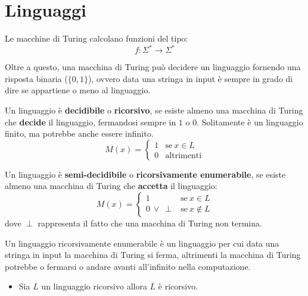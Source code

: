 \section{Linguaggi}
Le macchine di Turing calcolano funzioni del tipo:
\begin{equation}
    f: \Sigma^{\ast} \to \Sigma^{\ast}
\end{equation}

Oltre a questo, una macchina di Turing può decidere un linguaggio fornendo una risposta binaria ($\{0, 1\}$), ovvero data una stringa in input è sempre in grado di dire se appartiene o meno al linguaggio.
\begin{definizione} 
    Un linguaggio è \textbf{decidibile} o \textbf{ricorsivo}, se esiste almeno una macchina di Turing che \textbf{decide} il linguaggio, fermandosi sempre in $1$ o $0$. Solitamente è un linguaggio finito, ma potrebbe anche essere infinito.
    \begin{equation}
        M(x) = \begin{cases}
        1 & \text{se} \ x \in L \\
        0 & \text{altrimenti}
    \end{cases}
    \end{equation}
\end{definizione}
\begin{definizione} 
    Un linguaggio è \textbf{semi-decidibile} o \textbf{ricorsivamente enumerabile}, se esiste almeno una macchina di Turing che \textbf{accetta} il linguaggio:
    \begin{equation}
        M(x) = \begin{cases}
            1 & \text{se} \ x \in L \\
            0 \ \lor \ \perp & \text{se} \ x \notin L 
        \end{cases}
    \end{equation}
    dove $\perp$ rappresenta il fatto che una macchina di Turing non termina.
\end{definizione}

Un linguaggio ricorsivamente enumerabile è un linguaggio per cui data una stringa in input la macchina di Turing si ferma, altrimenti la macchina di Turing potrebbe o fermarsi o andare avanti all'infinito nella computazione.

\begin{itemize}
    \item Sia $L$ un linguaggio ricorsivo allora $\overline{L}$ è ricorsivo.
\end{itemize}


